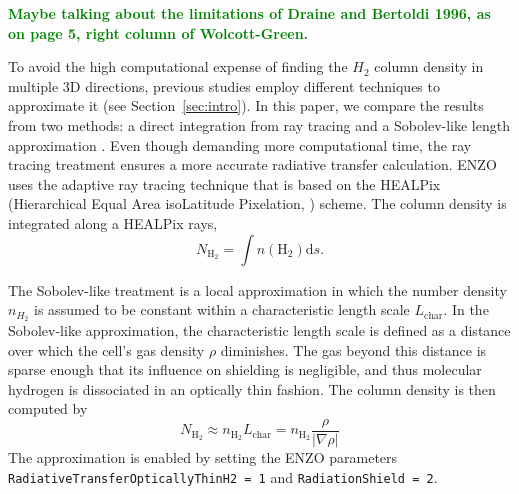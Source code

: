 \documentclass[linenumbers, twocolumn]{aastex631}
\newcommand{\acorr}[1]{\textbf{\textcolor{green}{#1}}}
\begin{document}
\acorr{Maybe talking about the limitations of Draine and Bertoldi 1996, as on page 5, right column of Wolcott-Green.}

To avoid the high computational expense of finding the $H_{2}$ column density in multiple 3D directions, previous studies employ different techniques to approximate it (see Section~\ref{sec:intro}). In this paper, we compare the results from two methods: a direct integration from ray tracing and a Sobolev-like length approximation \citep{Gnedin+2009, Wolcott-Green+2011}. Even though demanding more computational time, the ray tracing treatment ensures a more accurate radiative transfer calculation. ENZO uses the adaptive ray tracing technique \citep{Wise+2011} that is based on the HEALPix (Hierarchical Equal Area isoLatitude Pixelation, \citealt{Gorski+2005}) scheme. The column density is integrated along a HEALPix rays,
\begin{equation}
    N_{\text{H}_{2}} = \int n(\text{H}_{2})\text{d}s.
\label{eq:NH2_approximation}
\end{equation}

The Sobolev-like treatment is a local approximation in which the number density $n_{H_{2}}$ is assumed to be constant within a characteristic length scale $L_{\text{char}}$. In the Sobolev-like approximation, the characteristic length scale is defined as a distance over which the cell's gas density $\rho$ diminishes. The gas beyond this distance is sparse enough that its influence on shielding is negligible, and thus molecular hydrogen is dissociated in an optically thin fashion. The column density is then computed by
\begin{equation}
    N_{\text{H}_{2}} \approx n_{\text{H}_{2}}L_{\text{char}} =  n_{\text{H}_{2}}\frac{\rho}{|\nabla\rho|}
\end{equation}
The approximation is enabled by setting the ENZO parameters \texttt{RadiativeTransferOpticallyThinH2 = 1} and \texttt{RadiationShield = 2}.
\end{document}
